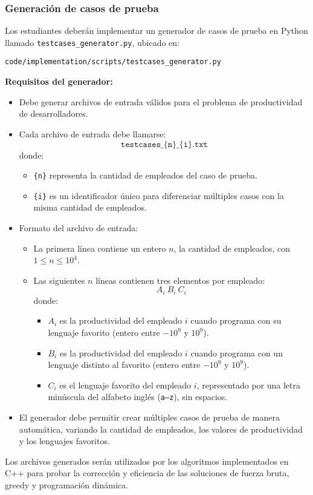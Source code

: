 \subsubsection{Generación de casos de prueba}

Los estudiantes deberán implementar un generador de casos de prueba en Python llamado \texttt{testcases\_generator.py}, ubicado en:

\begin{center}
    \texttt{code/implementation/scripts/testcases\_generator.py}
\end{center}

\textbf{Requisitos del generador:}
\begin{itemize}
    \item Debe generar archivos de entrada válidos para el problema de productividad de desarrolladores.
    \item Cada archivo de entrada debe llamarse:
    \[
        \texttt{testcases\_\{n\}\_\{i\}.txt}
    \]
    donde:
    \begin{itemize}
        \item \texttt{\{n\}} representa la cantidad de empleados del caso de prueba.
        \item \texttt{\{i\}} es un identificador único para diferenciar múltiples casos con la misma cantidad de empleados.
    \end{itemize}
    \item Formato del archivo de entrada:
    \begin{itemize}
        \item La primera línea contiene un entero $n$, la cantidad de empleados, con $1 \le n \le 10^4$.
        \item Las siguientes $n$ líneas contienen tres elementos por empleado:
        \[
        A_i \ B_i \ C_i
        \]
        donde:
        \begin{itemize}
            \item $A_i$ es la productividad del empleado $i$ cuando programa con su lenguaje favorito (entero entre $-10^9$ y $10^9$).
            \item $B_i$ es la productividad del empleado $i$ cuando programa con un lenguaje distinto al favorito (entero entre $-10^9$ y $10^9$).
            \item $C_i$ es el lenguaje favorito del empleado $i$, representado por una letra minúscula del alfabeto inglés (\texttt{a--z}), sin espacios.
        \end{itemize}
    \end{itemize}
    \item El generador debe permitir crear múltiples casos de prueba de manera automática, variando la cantidad de empleados, los valores de productividad y los lenguajes favoritos.
\end{itemize}

\begin{mdframed}
    Los archivos generados serán utilizados por los algoritmos implementados en C++ para probar la corrección y eficiencia de las soluciones de fuerza bruta, greedy y programación dinámica.
\end{mdframed}
